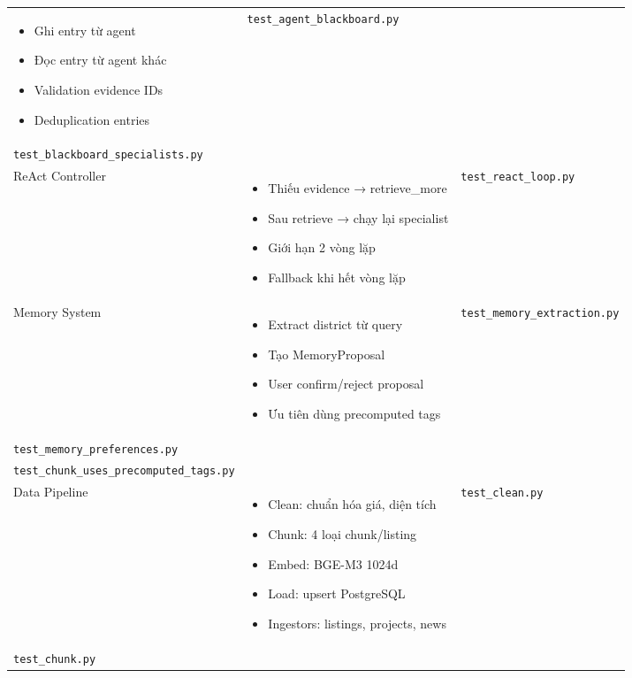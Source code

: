 \begin{longtable}{|p{3.5cm}|p{5cm}|p{5cm}|}
    \begin{itemize}
        \item Ghi entry từ agent
        \item Đọc entry từ agent khác
        \item Validation evidence IDs
        \item Deduplication entries
    \end{itemize} & 
    \texttt{test\_agent\_blackboard.py} \\
    \texttt{test\_blackboard\_specialists.py} \\
    \hline
    ReAct Controller & 
    \begin{itemize}
        \item Thiếu evidence → retrieve\_more
        \item Sau retrieve → chạy lại specialist
        \item Giới hạn 2 vòng lặp
        \item Fallback khi hết vòng lặp
    \end{itemize} & 
    \texttt{test\_react\_loop.py} \\
    \hline
    Memory System & 
    \begin{itemize}
        \item Extract district từ query
        \item Tạo MemoryProposal
        \item User confirm/reject proposal
        \item Ưu tiên dùng precomputed tags
    \end{itemize} & 
    \texttt{test\_memory\_extraction.py} \\
    \texttt{test\_memory\_preferences.py} \\
    \texttt{test\_chunk\_uses\_precomputed\_tags.py} \\
    \hline
    Data Pipeline & 
    \begin{itemize}
        \item Clean: chuẩn hóa giá, diện tích
        \item Chunk: 4 loại chunk/listing
        \item Embed: BGE-M3 1024d
        \item Load: upsert PostgreSQL
        \item Ingestors: listings, projects, news
    \end{itemize} & 
    \texttt{test\_clean.py} \\
    \texttt{test\_chunk.py} \\

\end{longtable}
